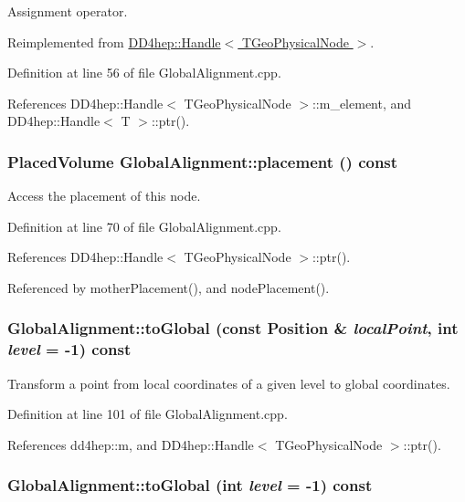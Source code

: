Assignment operator. 

Reimplemented from \hyperlink{class_d_d4hep_1_1_handle_a9bbf8f498df42e81ad26fb00233505a6}{DD4hep::Handle$<$ TGeoPhysicalNode $>$}.

Definition at line 56 of file GlobalAlignment.cpp.

References DD4hep::Handle$<$ TGeoPhysicalNode $>$::m\_\-element, and DD4hep::Handle$<$ T $>$::ptr().\hypertarget{class_d_d4hep_1_1_alignments_1_1_global_alignment_a4445f18516ca144ef79493f15b4042cf}{
\subsubsection[{placement}]{\setlength{\rightskip}{0pt plus 5cm}PlacedVolume GlobalAlignment::placement () const}}
\label{class_d_d4hep_1_1_alignments_1_1_global_alignment_a4445f18516ca144ef79493f15b4042cf}


Access the placement of this node. 

Definition at line 70 of file GlobalAlignment.cpp.

References DD4hep::Handle$<$ TGeoPhysicalNode $>$::ptr().

Referenced by motherPlacement(), and nodePlacement().\hypertarget{class_d_d4hep_1_1_alignments_1_1_global_alignment_a1ae3bd19e88fdf178a5595f829d0210a}{
\subsubsection[{toGlobal}]{ GlobalAlignment::toGlobal (const {\bf Position} \& {\em localPoint}, \/  int {\em level} = {\ttfamily -\/1}) const}}
\label{class_d_d4hep_1_1_alignments_1_1_global_alignment_a1ae3bd19e88fdf178a5595f829d0210a}


Transform a point from local coordinates of a given level to global coordinates. 

Definition at line 101 of file GlobalAlignment.cpp.

References dd4hep::m, and DD4hep::Handle$<$ TGeoPhysicalNode $>$::ptr().\hypertarget{class_d_d4hep_1_1_alignments_1_1_global_alignment_ab9ed5fdc920cd4d8ed4303096aaec174}{
\subsubsection[{toGlobal}]{ GlobalAlignment::toGlobal (int {\em level} = {\ttfamily -\/1}) const}}
\label{class_d_d4hep_1_1_alignments_1_1_global_alignment_ab9ed5fdc920cd4d8ed4303096aaec174}


